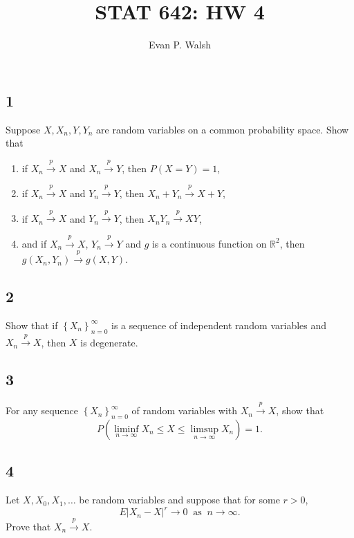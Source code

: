 \documentclass[12pt]{article}
\title{STAT 642: HW 4}
\author{Evan P. Walsh}
\begin{document}
\maketitle

\def\cp{\stackrel{p}{\rightarrow}}
\def\as{\stackrel{\text{a.s.}}{\longrightarrow}}

\subsection*{1}
\begin{tcolorbox}
Suppose $X, X_{n}, Y, Y_{n}$ are random variables on a common probability space. Show that
\begin{enumerate}[label=(\roman*)]
\item if $X_{n} \stackrel{p}{\rightarrow} X$ and $X_{n}\stackrel{p}{\rightarrow}Y$, then $P(X = Y) = 1$,
\item if $X_{n}\cp X$ and $Y_{n} \cp Y$, then $X_{n} + Y_{n} \cp X + Y$,
\item if $X_{n}\cp X$ and $Y_{n}\cp Y$, then $X_{n}Y_{n}\cp XY$, 
\item and if $X_{n}\cp X$, $Y_{n}\cp Y$ and $g$ is a continuous function on $\mathbb{R}^{2}$, then $g(X_{n},Y_{n})\cp g(X,Y)$.
\end{enumerate}
\end{tcolorbox}

\subsection*{2}
\begin{tcolorbox}
Show that if $\left\{ X_{n} \right\}_{n=0}^{\infty}$ is a sequence of independent random variables and $X_{n} \cp X$, then $X$ is degenerate.
\end{tcolorbox}

\subsection*{3}
\begin{tcolorbox}
For any sequence $\left\{ X_{n} \right\}_{n=0}^{\infty}$ of random variables with $X_{n}\cp X$, show that 
\[ P(\liminf_{n\rightarrow\infty}X_{n}\leq X\leq \limsup_{n\rightarrow\infty}X_{n}) = 1. \]
\end{tcolorbox}

\subsection*{4}
\begin{tcolorbox}
Let $X, X_{0}, X_{1}, \hdots$ be random variables and suppose that for some $r > 0$,
\[ E|X_{n} - X|^{r} \rightarrow 0 \ \text{ as } \ n \rightarrow \infty. \]
Prove that $X_{n}\cp X$.
\end{tcolorbox}
\end{document}
